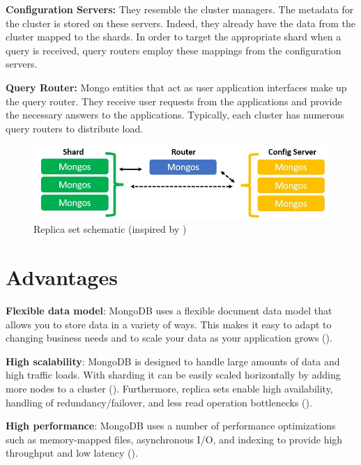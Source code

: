 \textbf{Configuration Servers:} They resemble the cluster managers. The metadata for the cluster is stored on these servers. Indeed, they already have the data from the cluster mapped to the shards. In order to target the appropriate shard when a query is received, query routers employ these mappings from the configuration servers.

\textbf{Query Router:} Mongo entities that act as user application interfaces make up the query router. They receive user requests from the applications and provide the necessary answers to the applications. Typically, each cluster has numerous query routers to distribute load.

\begin{figure}[H]
    \centering
    \includegraphics[width=1.0\textwidth]{images/sharding.jpeg}
        \caption{Replica set schematic (inspired by \cite{mongodb_sharding})}
    \label{fig:Sharding}
\end{figure}

\section{Advantages}
\textbf{Flexible data model}: MongoDB uses a flexible document data model that allows you to store data in a variety of ways. This makes it easy to adapt to changing business needs and to scale your data as your application grows (\cites{mongodb-datamodels}{knowledgenile-pro-con}). 

\textbf{High scalability}: MongoDB is designed to handle large amounts of data and high traffic loads. With sharding it can be easily scaled horizontally by adding more nodes to a cluster (\cites{mongodb-scalability}{dataflair_2018}). Furthermore, replica sets enable high availability, handling of redundancy/failover, and less read operation bottlenecks (\cite{mongodb-replica-sets}).

\textbf{High performance}: MongoDB uses a number of performance optimizations such as memory-mapped files, asynchronous I/O, and indexing to provide high throughput and low latency (\cites{mongodb-performance}{knowledgenile-pro-con}).

